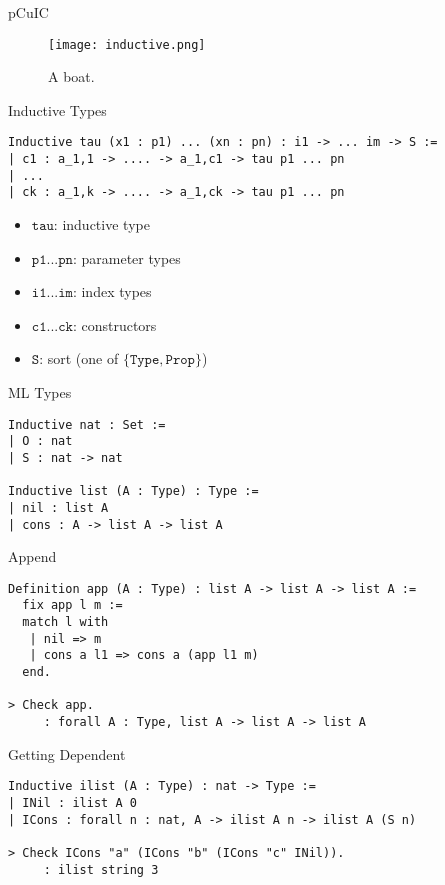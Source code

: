 \documentclass{beamer}
\begin{document}
\begin{frame}[fragile]{pCuIC}
\begin{figure}
  \texttt{[image: inductive.png]}
  \caption{A boat.}
  \label{fig:boat1}
\end{figure}
\end{frame}
\begin{frame}[fragile]{Inductive Types}
\begin{verbatim}
Inductive tau (x1 : p1) ... (xn : pn) : i1 -> ... im -> S :=  
| c1 : a_1,1 -> .... -> a_1,c1 -> tau p1 ... pn
| ...
| ck : a_1,k -> .... -> a_1,ck -> tau p1 ... pn
\end{verbatim}

\begin{itemize}
\item $\texttt{tau}$: inductive type
\item $\texttt{p1} ... \texttt{pn}$: parameter types
\item $\texttt{i1} ... \texttt{im}$: index types
\item $\texttt{c1} ... \texttt{ck}$: constructors
\item $\texttt{S}$: sort (one of $\{\texttt{Type},\texttt{Prop}\}$)
\end{itemize}

\end{frame}

\begin{frame}[fragile]{ML Types}
\begin{verbatim}
Inductive nat : Set :=  
| O : nat 
| S : nat -> nat

Inductive list (A : Type) : Type :=  
| nil : list A 
| cons : A -> list A -> list A
\end{verbatim}
\end{frame}

\begin{frame}[fragile]{Append}
\begin{verbatim}
Definition app (A : Type) : list A -> list A -> list A :=
  fix app l m :=
  match l with
   | nil => m
   | cons a l1 => cons a (app l1 m)
  end.

> Check app.
     : forall A : Type, list A -> list A -> list A
\end{verbatim}
\end{frame}

\begin{frame}[fragile]{Getting Dependent}
\begin{verbatim}
Inductive ilist (A : Type) : nat -> Type :=
| INil : ilist A 0 
| ICons : forall n : nat, A -> ilist A n -> ilist A (S n)

> Check ICons "a" (ICons "b" (ICons "c" INil)).
     : ilist string 3
\end{verbatim}
\end{frame}
\end{document}
